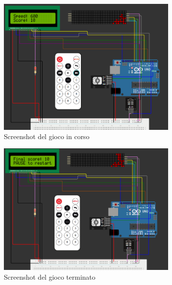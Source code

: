 \documentclass[a4paper, 12pt]{article}
\begin{document}
\begin{figure}[H]
    \centering
    \includegraphics[width=0.8\textwidth]{media/in_gioco.png}
    \caption{Screenshot del gioco in corso}
    \label{fig:in_gioco}
\end{figure}


\begin{figure}[H]
    \centering
    \includegraphics[width=0.8\textwidth]{media/fine_gioco.png}
    \caption{Screenshot del gioco terminato}
    \label{fig:fine_gioco}
\end{figure}


\newpage
{}
\printbibliography
\end{document}
